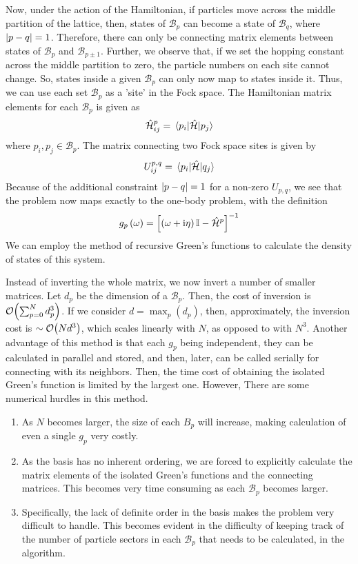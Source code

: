 	Now, under the action of the Hamiltonian, if particles move across the middle partition of the lattice, then, states of $ \mathcal{B}_p $ can become a state of $ \mathcal{B}_{q} $, where $ \abs{p-q} = 1 $. Therefore, there can only be connecting matrix elements between states of $ \mathcal{B}_p $ and $ \mathcal{B}_{p \pm 1} $. Further, we observe that, if we set the hopping constant across the middle partition to zero, the particle numbers on each site cannot change. So, states inside a given $ \mathcal{B}_p $ can only now map to states inside it. Thus, we can use each set $ \mathcal{B}_p $ as a 'site' in the Fock space. The Hamiltonian matrix elements for each $ \mathcal{B}_p $ is given as
	\begin{align}
		{\hat{\mathcal{H}}^{p}}_{ij} = \mel{p_i}{\hat{\mathcal{H}}}{p_j}
	\end{align}
	where $ p_i, p_j \in \mathcal{B}_p$. The matrix connecting two Fock space sites is given by \begin{align}
		U^{p,q}_{ij} = \mel{p_i}{\hat{\mathcal{H}}}{q_j}
	\end{align}
	Because of the additional constraint $ \abs{p-q} = 1 $ for a non-zero $ U_{p,q} $, we see that the problem now maps exactly to the one-body problem, with the definition
	\begin{align}
		g_p\left(\omega\right) = \left[ \left( \omega + \mathrm{i} \eta\right) \mathbb{I} - \hat{\mathcal{H}}^{p} \right]^{-1} 
	\end{align}
	We can employ the method of recursive Green's functions to calculate the density of states of this system.
	
	Instead of inverting the whole matrix, we now invert a number of smaller matrices.
	Let $ d_p $ be the dimension of a $ \mathcal{B}_p $. Then, the cost of inversion is $ \order{\sum_{p=0}^{N} d^{3}_p} $. If we consider $ d = \max_p \left( d_p \right)  $, then, approximately, the inversion cost is $ \sim \order{N d^3} $, which scales linearly with $ N $, as opposed to with $ N^3 $. Another advantage of this method is that each $ g_p $ being independent, they can be calculated in parallel and stored, and then, later, can be called serially for connecting with its neighbors. Then, the time cost of obtaining the isolated Green's function is limited by the largest one. However, There are some numerical hurdles in this method.
	\begin{enumerate}
		\item As $ N $ becomes larger, the size of each $ B_p $ will increase, making calculation of even a single $ g_p $ very costly.
		\item As the basis has no inherent ordering, we are forced to explicitly calculate the matrix elements of the isolated Green's functions and the connecting matrices. This becomes very time consuming as each $ \mathcal{B}_p $ becomes larger.
		\item 	Specifically, the lack of definite order in the basis makes the problem very difficult to handle. This becomes evident in the difficulty of keeping track of the number of particle sectors in each $ \mathcal{B}_p $ that needs to be calculated, in the algorithm.
	\end{enumerate}

	
	
	
	
	
	
	